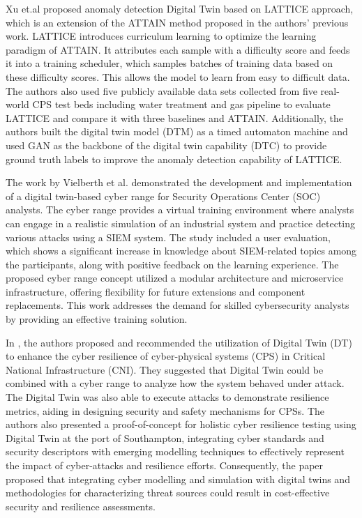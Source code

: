 Xu et.al \cite{xuDigitalTwinbasedAnomaly2023a} proposed anomaly detection Digital Twin based on LATTICE approach, which is an extension of the ATTAIN method proposed in the authors' previous work. LATTICE introduces curriculum learning to optimize the learning paradigm of ATTAIN. It attributes each sample with a difficulty score and feeds it into a training scheduler, which samples batches of training data based on these difficulty scores. This allows the model to learn from easy to difficult data. The authors also used five publicly available data sets collected from five real-world CPS test beds including water treatment and gas pipeline to evaluate LATTICE and compare it with three baselines and ATTAIN. Additionally, the authors built the digital twin model (DTM) as a timed automaton machine and used GAN as the backbone of the digital twin capability (DTC) to provide ground truth labels to improve the anomaly detection capability of LATTICE.


The work by Vielberth et al. \cite{vielberth2021digital} demonstrated the development and implementation of a digital twin-based cyber range for Security Operations Center (SOC) analysts. The cyber range provides a virtual training environment where analysts can engage in a realistic simulation of an industrial system and practice detecting various attacks using a SIEM system. The study included a user evaluation, which shows a significant increase in knowledge about SIEM-related topics among the participants, along with positive feedback on the learning experience. The proposed cyber range concept utilized a modular architecture and microservice infrastructure, offering flexibility for future extensions and component replacements. This work addresses the demand for skilled cybersecurity analysts by providing an effective training solution.



In \cite{epiphaniouDigitalTwinsCyber2023a}, the authors proposed and recommended the utilization of Digital Twin (DT) to enhance the cyber resilience of cyber-physical systems (CPS) in Critical National Infrastructure (CNI). They suggested that Digital Twin could be combined with a cyber range to analyze how the system behaved under attack. The Digital Twin was also able to execute attacks to demonstrate resilience metrics, aiding in designing security and safety mechanisms for CPSs. The authors also presented a proof-of-concept for holistic cyber resilience testing using Digital Twin at the port of Southampton, integrating cyber standards and security descriptors with emerging modelling techniques to effectively represent the impact of cyber-attacks and resilience efforts. Consequently, the paper proposed that integrating cyber modelling and simulation with digital twins and methodologies for characterizing threat sources could result in cost-effective security and resilience assessments.

